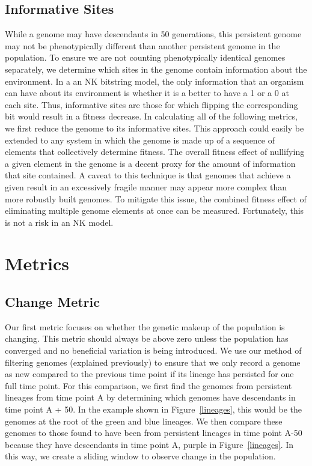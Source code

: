 \documentclass[letterpaper]{article}
\begin{document}
\subsection{Informative Sites}
    While a genome may have descendants in 50 generations, this persistent genome may not be phenotypically different than another persistent genome in the population. To ensure we are not counting phenotypically identical genomes separately, we determine which sites in the genome contain information about the environment. In a an NK bitstring model, the only information that an organism can have about its environment is whether it is a better to have a 1 or a 0 at each site. Thus, informative sites are those for which flipping the corresponding bit would result in a fitness decrease. In calculating all of the following metrics, we first reduce the genome to its informative sites.
    This approach could easily be extended to any system in which the genome is made up of a sequence of elements that collectively determine fitness. The overall fitness effect of nullifying a given element in the genome is a decent proxy for the amount of information that site contained. A caveat to this technique is that genomes that achieve a given result in an excessively fragile manner may appear more complex than more robustly built genomes. To mitigate this issue, the combined fitness effect of eliminating multiple genome elements at once can be measured. Fortunately, this is not a risk in an NK model.

\section{Metrics}

\subsection{Change Metric}
    Our first metric focuses on whether the genetic makeup of the population is changing. This metric should always be above zero unless the population has converged and no beneficial variation is being introduced. We use our method of filtering genomes (explained previously) to ensure that we only record a genome as new compared to the previous time point if its lineage has persisted for one full time point. For this comparison, we first find the genomes from persistent lineages from time point A by determining which genomes have descendants in time point A + 50. In the example shown in Figure~\ref{lineages}, this would be the genomes at the root of the green and blue lineages. We then compare these genomes to those found to have been from persistent lineages in time point A-50 because they have descendants in time point A, purple in Figure~\ref{lineages}. In this way, we create a sliding window to observe change in the population.
\end{document}
